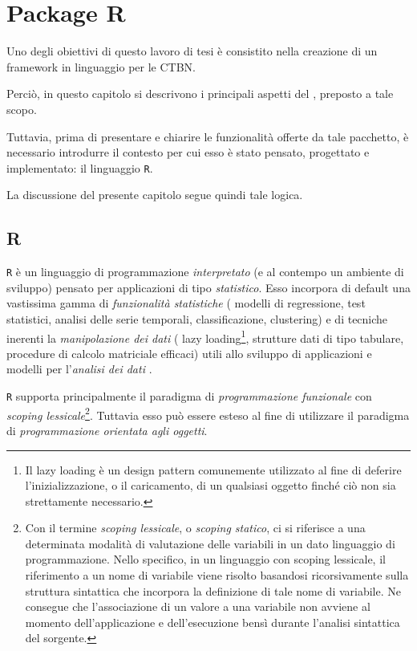 
\chapter{Package R}
\label{cap:ctbnr}
Uno degli obiettivi di questo lavoro di tesi è consistito nella creazione di un framework in linguaggio  per le \acs{CTBN}.

Perciò, in questo capitolo si descrivono i principali aspetti del \pacchettor{}, preposto a tale scopo.

Tuttavia, prima di presentare e chiarire le funzionalità offerte da tale pacchetto, è necessario introdurre il contesto per cui esso è stato pensato, progettato e implementato: il linguaggio \lstinline$R$.

La discussione del presente capitolo segue quindi tale logica.

\section{R}\label{sec:roverview}
\lstinline$R$ è un linguaggio di programmazione \emph{interpretato} (e al contempo un ambiente di sviluppo) pensato per applicazioni di tipo \emph{statistico}. Esso incorpora di default una vastissima gamma di \emph{funzionalità statistiche} (\eg{} modelli di regressione, test statistici, analisi delle serie temporali, classificazione, clustering) e di tecniche inerenti la \emph{manipolazione dei dati} (\eg{} lazy loading\footnote{Il lazy loading è un design pattern comunemente utilizzato al fine di deferire l'inizializzazione, o il caricamento, di un qualsiasi oggetto finché ciò non sia strettamente necessario.}, strutture dati di tipo tabulare, procedure di calcolo matriciale efficaci) utili allo sviluppo di applicazioni e modelli per l'\emph{analisi dei dati} \citep{R2013}.

\lstinline$R$ supporta principalmente il paradigma di \emph{programmazione funzionale} con \emph{scoping lessicale}\footnote{Con il termine \emph{scoping lessicale}, o \emph{scoping statico}, ci si riferisce a una determinata modalità di valutazione delle variabili in un dato linguaggio di programmazione. Nello specifico, in un linguaggio con scoping lessicale, il riferimento a un nome di variabile viene risolto basandosi ricorsivamente sulla struttura sintattica che incorpora la definizione di tale nome di variabile. Ne consegue che l'associazione di un valore a una variabile non avviene al momento dell'applicazione e dell'esecuzione bensì durante l'analisi sintattica del sorgente.}. Tuttavia esso può essere esteso al fine di utilizzare il paradigma di \emph{programmazione orientata agli oggetti}.

